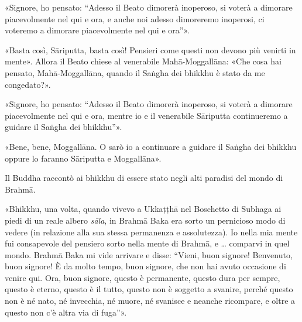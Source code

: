 «Signore, ho pensato: “Adesso il Beato dimorerà inoperoso, si voterà a dimorare
piacevolmente nel qui e ora, e anche noi adesso dimoreremo inoperosi, ci
voteremo a dimorare piacevolmente nel qui e ora”».

«Basta così, Sāriputta, basta così! Pensieri come questi non devono più venirti
in mente». Allora il Beato chiese al venerabile Mahā-Moggallāna: «Che cosa hai
pensato, Mahā-Moggallāna, quando il Saṅgha dei bhikkhu è stato da me
congedato?».

«Signore, ho pensato: “Adesso il Beato dimorerà inoperoso, si voterà a dimorare
piacevolmente nel qui e ora, mentre io e il venerabile Sāriputta continueremo a
guidare il Saṅgha dei bhikkhu”».

«Bene, bene, Moggallāna. O sarò io a continuare a guidare il Saṅgha dei bhikkhu
oppure lo faranno Sāriputta e Moggallāna».


 Il Buddha raccontò ai bhikkhu di essere stato
negli alti paradisi del mondo di Brahmā.

 «Bhikkhu, una volta, quando vivevo a Ukkaṭṭhā nel Boschetto
di Subhaga ai piedi di un reale albero \emph{sāla}, in Brahmā Baka era sorto un
pernicioso modo di vedere (in relazione alla sua stessa permanenza e
assolutezza). Io nella mia mente fui consapevole del pensiero sorto nella mente
di Brahmā, e … comparvi in quel mondo. Brahmā Baka mi vide arrivare e disse:
“Vieni, buon signore! Benvenuto, buon signore! È da molto tempo, buon signore,
che non hai avuto occasione di venire qui. Ora, buon signore, questo è
permanente, questo dura per sempre, questo è eterno, questo è il tutto, questo
non è soggetto a svanire, perché questo non è né nato, né invecchia, né muore,
né svanisce e neanche ricompare, e oltre a questo non c’è altra via di fuga”».

